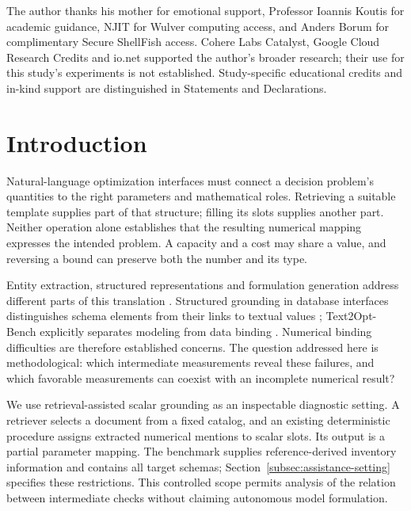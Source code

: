 \documentclass[pdflatex,iicol,sn-basic,Numbered]{sn-jnl}
\begin{document}
\maketitle



The author thanks his mother for emotional support, Professor Ioannis Koutis for academic guidance, NJIT for Wulver computing access, and Anders Borum for complimentary Secure ShellFish access. Cohere Labs Catalyst, Google Cloud Research Credits and io.net supported the author's broader research; their use for this study's experiments is not established. Study-specific educational credits and in-kind support are distinguished in Statements and Declarations.

\section{Introduction}
Natural-language optimization interfaces must connect a decision problem's quantities to the right parameters and mathematical roles. Retrieving a suitable template supplies part of that structure; filling its slots supplies another part. Neither operation alone establishes that the resulting numerical mapping expresses the intended problem. A capacity and a cost may share a value, and reversing a bound can preserve both the number and its type.

Entity extraction, structured representations and formulation generation address different parts of this translation \cite{ramamonjison2022autoformulation,ramamonjison2023nl4opt,kadioglu2024ner4opt,ahmaditeshnizi2024optimus_icml}. Structured grounding in database interfaces distinguishes schema elements from their links to textual values \cite{deng2021strug,wang2020ratsql}; Text2Opt-Bench explicitly separates modeling from data binding \cite{gao2026models}. Numerical binding difficulties are therefore established concerns. The question addressed here is methodological: which intermediate measurements reveal these failures, and which favorable measurements can coexist with an incomplete numerical result?

We use retrieval-assisted scalar grounding as an inspectable diagnostic setting. A retriever selects a document from a fixed catalog, and an existing deterministic procedure assigns extracted numerical mentions to scalar slots. Its output is a partial parameter mapping. The benchmark supplies reference-derived inventory information and contains all target schemas; Section~\ref{subsec:assistance-setting} specifies these restrictions. This controlled scope permits analysis of the relation between intermediate checks without claiming autonomous model formulation.
\end{document}
